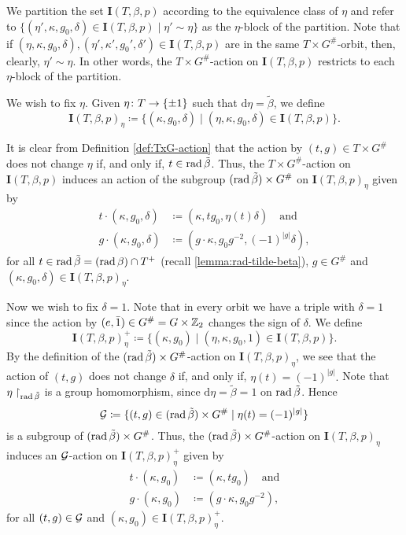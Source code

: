 We partition the set $\mathbf{I}(T, \beta, p)$ according to the equivalence class of $\eta$ and refer to $\{ (\eta', \kappa, g_0, \delta) \in \mathbf{I}(T, \beta, p) \mid \eta' \sim \eta \}$ as the $\eta$-block of the partition.
Note that if $(\eta, \kappa, g_0, \delta), (\eta', \kappa', g_0', \delta') \in \mathbf{I}(T, \beta, p)$ are in the same $T\times G^\#$-orbit, then, clearly, $\eta' \sim \eta$.
In other words, the $T\times G^\#$-action on $\mathbf{I}(T, \beta, p)$ restricts to each $\eta$-block of the partition.

We wish to fix $\eta$.
Given $\eta\colon T \to \{ \pm 1 \}$ such that $\mathrm{d}\eta = \tilde\beta$,
we define
\[
	\mathbf{I}(T, \beta, p)_\eta \coloneqq \{ (\kappa, g_0, \delta) \mid (\eta, \kappa, g_0, \delta) \in \mathbf{I}(T, \beta, p)\}.
\]

It is clear from Definition \ref{def:TxG-action} that the action by $(t,g)\in T\times G^\#$ does not change $\eta$ if, and only if, $t\in \operatorname{rad} \tilde\beta$.
Thus, the $T\times G^\#$-action on $\mathbf{I}(T, \beta, p)$ induces an action of the subgroup $(\operatorname{rad} \tilde\beta) \times G^\#$ on $\mathbf{I}(T, \beta, p)_\eta$ given by
\begin{align}
	t \cdot (\kappa, g_0, \delta) & \coloneqq (\kappa, t g_0, \eta(t)\delta)
	\quad \text{and}                                                                          \\
	g \cdot (\kappa, g_0, \delta) & \coloneqq (g\cdot \kappa, g_0 g^{-2}, (-1)^{|g|} \delta),
\end{align}
for all $t\in \operatorname{rad} \tilde\beta = (\operatorname{rad} \beta) \cap T^+$ (recall \cref{lemma:rad-tilde-beta}), $g\in G^\#$ and $(\kappa, g_0, \delta) \in \mathbf{I}(T, \beta, p)_\eta$. 

Now we wish to fix $\delta = 1$.
Note that in every orbit we have a triple with $\delta = 1$ since the action by $(e, \bar1) \in G^\# = G \times \mathbb{Z}_2$ changes the sign of $\delta$.
We define
\[\label{eq:I-eta-plus}
	\mathbf{I}(T, \beta, p)_\eta^+ \coloneqq \{ (\kappa, g_0) \mid (\eta, \kappa, g_0, 1) \in \mathbf{I}(T, \beta, p) \}.
\]
By the definition of the $(\operatorname{rad} \tilde\beta) \times G^\#$-action on $\mathbf{I}(T, \beta, p)_\eta$, we see that the action of $(t,g)$ does not change $\delta$ if, and only if, $
	\eta(t) = (-1)^{|g|}.
$
Note that $\eta\restriction_{\operatorname{rad} \tilde\beta}$ is a group homomorphism, since $\mathrm{d}\eta = \tilde\beta = 1$ on $\operatorname{rad} \tilde\beta$.
Hence
\[\label{eq:mathcal-G}
	\mathcal G \coloneqq \{ (t,g) \in (\operatorname{rad} \tilde\beta) \times G^\# \mid \eta(t) = (-1)^{|g|} \}
\]
is a subgroup of $(\operatorname{rad} \tilde\beta) \times G^\#$.
Thus, the $(\operatorname{rad} \tilde\beta) \times G^\#$-action on $\mathbf{I}(T, \beta, p)_\eta$ induces an $\mathcal G$-action on $\mathbf{I}(T, \beta, p)_\eta^+$ given by
\begin{equation}\label{eq:mc-G-action}
\begin{split}
	t \cdot (\kappa, g_0) & \coloneqq (\kappa, t g_0)
	\quad \text{and} \\
	g \cdot (\kappa, g_0) & \coloneqq (g\cdot \kappa, g_0 g^{-2}),
\end{split}
\end{equation}
for all $(t, g)\in \mathcal G$ and $(\kappa, g_0) \in \mathbf{I}(T, \beta, p)_\eta^+$. 

